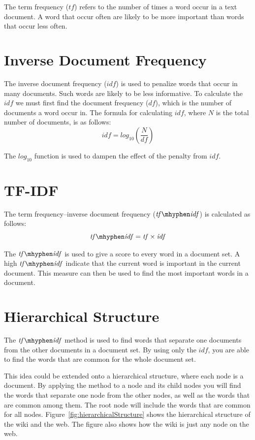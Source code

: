 \documentclass[a4paper]{book}
\newcommand\tf{\mathit{tf}}
\newcommand\df{\mathit{df}}
\newcommand\idf{\mathit{idf}}
\newcommand\tfidf{\mathit{tf\mhyphen idf}}
\begin{document}
The term frequency ($\tf$) refers to the number of times a word occur in a text document. A word that occur often are likely to be more important than words that occur less often.

\section{Inverse Document Frequency}
\label{sec:inverseDocumentFrequency}

The inverse document frequency ($\idf$) is used to penalize words that occur in many documents. Such words are likely to be less informative. To calculate the $\idf$ we must first find the document frequency ($\df$), which is the number of documents a word occur in. The formula for calculating $\idf$, where $N$ is the total number of documents, is as follows:
\[
\idf = \textit{log}_{10}\left(\frac{N}{\df}\right)
\]

The $\textit{log}_{10}$ function is used to dampen the effect of the penalty from $\idf$.

\section{TF-IDF}
\label{sec:tfIdf}

The term frequency--inverse document frequency ($\tfidf$) is calculated as follows:
\[
\tfidf = \tf \times \idf
\]

The $\tfidf$ is used to give a score to every word in a document set. A high $\tfidf$ indicate that the current word is important in the current document. This measure can then be used to find the most important words in a document.

\section{Hierarchical Structure}
\label{sec:hierarchicalStructure}

The $\tfidf$ method is used to find words that separate one documents from the other documents in a document set. By using only the $\idf$, you are able to find the words that are common for the whole document set.

This idea could be extended onto a hierarchical structure, where each node is a document. By applying the method to a node and its child nodes you will find the words that separate one node from the other nodes, as well as the words that are common among them. The root node will include the words that are common for all nodes. Figure~\ref{fig:hierarchicalStructure} shows the hierarchical structure of the wiki and the web. The figure also shows how the wiki is just any node on the web.
\end{document}
